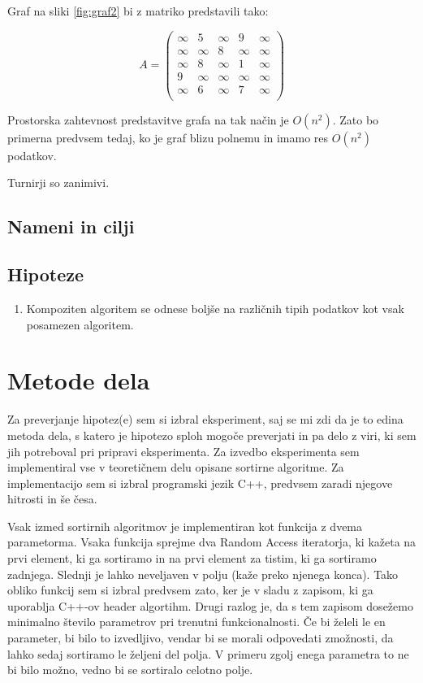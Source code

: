 \documentclass[a4paper,oneside]{article}
\begin{document}
Graf na sliki \ref{fig:graf2} bi z matriko predstavili tako:

\[
A = \left(
\begin{array}{ccccc}
  \infty & 5      & \infty & 9      & \infty \\
  \infty & \infty & 8      & \infty & \infty \\
  \infty & 8      & \infty & 1      & \infty \\
  9      & \infty & \infty & \infty & \infty \\
  \infty & 6      & \infty & 7      & \infty \\
\end{array}
\right)
\]

Prostorska zahtevnost predstavitve grafa na tak način je $O(n^2)$. Zato bo primerna
predvsem tedaj, ko je graf blizu polnemu in imamo res $O(n^2)$ podatkov.

Turnirji so zanimivi.

\subsection{Nameni in cilji}
\subsection{Hipoteze}
\begin{enumerate}
  \item Kompoziten algoritem se odnese boljše na različnih tipih podatkov kot vsak
    posamezen algoritem.
\end{enumerate}
\section{Metode dela}
Za preverjanje hipotez(e) sem si izbral eksperiment, saj se mi zdi da je to edina metoda
dela, s katero je hipotezo sploh mogoče preverjati in pa delo z viri, ki sem jih
potreboval pri pripravi eksperimenta.
Za izvedbo eksperimenta sem implementiral vse v teoretičnem delu opisane sortirne
algoritme. Za implementacijo sem si izbral programski jezik C++, predvsem zaradi njegove
hitrosti in še česa. %

Vsak izmed sortirnih algoritmov je implementiran kot funkcija z dvema parametorma.
Vsaka funkcija sprejme dva Random Access iteratorja, %
ki kažeta na prvi element, ki ga sortiramo in na prvi element za tistim, ki ga sortiramo
zadnjega. Slednji je lahko neveljaven v polju (kaže preko njenega konca).
Tako obliko funkcij sem si izbral predvsem zato, ker je v sladu z zapisom, ki ga uporablja
C++-ov header algortihm. Drugi razlog je, da s tem zapisom dosežemo minimalno število
parametrov pri trenutni funkcionalnosti. Če bi želeli le en parameter, bi bilo to
izvedljivo, vendar bi se morali odpovedati zmožnosti, da lahko sedaj sortiramo le željeni
del polja. V primeru zgolj enega parametra to ne bi bilo možno, vedno bi se
sortiralo celotno polje.
\end{document}
